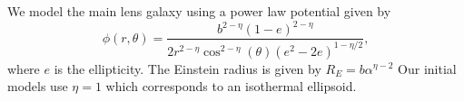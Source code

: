 We model the main lens galaxy using a power law potential given by
\begin{equation}
\phi(r, \theta) = \frac{b^{2 - \eta} (1 - e)^ {2 - \eta}}{2 r^{2 - \eta} \cos^{2 - \eta}(\theta) (e^2 - 2 e )^{1 - \eta / 2}},
\end{equation}
where $e$ is the ellipticity. The Einstein radius is given by $R_E = b \alpha^{\eta - 2}$ Our initial models use $\eta = 1$ which corresponds to an isothermal ellipsoid. 